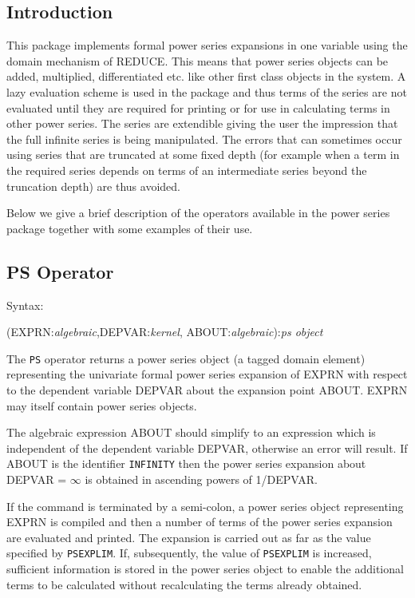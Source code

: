 
 
 
\subsection{Introduction}
This package implements formal power series expansions in one
variable using the domain mechanism of REDUCE. This means that power
series objects can be added, multiplied, differentiated etc. like other
first class objects in the system. A lazy evaluation scheme is used in
the package and thus terms of the series are not evaluated until they
are required for printing or for use in calculating terms in other
power series. The series are extendible giving the user the impression
that the full infinite series is being manipulated.  The errors that
can sometimes occur using series that are truncated at some fixed depth
(for example when a term in the required series depends on terms of an
intermediate series beyond the truncation depth) are thus avoided.

Below we give a brief description of the operators available in the
power series package together with some examples of their use.

\subsection{PS Operator}

Syntax:

(EXPRN:{\em algebraic},DEPVAR:{\em kernel},
ABOUT:{\em algebraic}):{\em ps object}

The {\tt PS} operator returns a  power series object
(a tagged domain element)
representing the univariate formal power series expansion of EXPRN with
respect to the dependent variable DEPVAR about the expansion point
ABOUT.  EXPRN may itself contain power series objects.

The algebraic expression ABOUT should simplify to an expression
which is independent of the dependent variable DEPVAR, otherwise
an error will result.  If ABOUT is the identifier {\tt INFINITY}
then the power series expansion about DEPVAR = $\infty$ is
obtained in ascending powers of 1/DEPVAR.

If the command is terminated by a semi-colon, a power series object
representing EXPRN is compiled and then a number of terms of the
power series expansion are evaluated and printed.  The expansion is
carried out as far as the value specified by {\tt PSEXPLIM}.  If,
subsequently, the value of {\tt PSEXPLIM} is increased, sufficient
information is stored in the power series object to enable the
additional terms to be calculated without recalculating the terms
already obtained.

